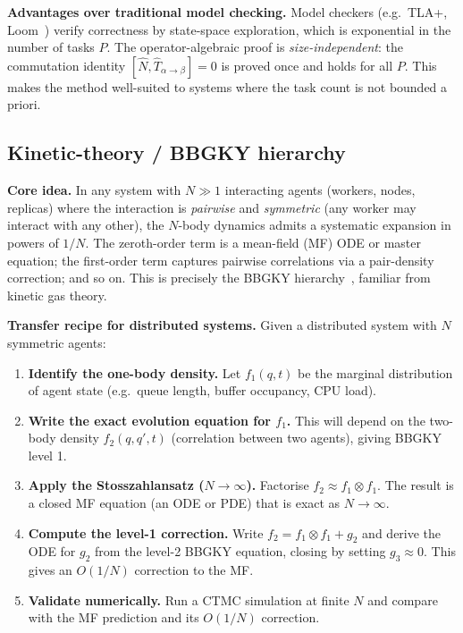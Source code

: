 \documentclass[11pt,a4paper]{article}
\begin{document}
\medskip
\noindent\textbf{Advantages over traditional model checking.}
Model checkers (e.g.\ TLA+, Loom~\cite{loom2023}) verify correctness by state-space
exploration, which is exponential in the number of tasks $P$.
The operator-algebraic proof is \emph{size-independent}: the commutation
identity $[\hat{N}, \hat{T}_{\alpha\to\beta}] = 0$ is proved once and holds
for all $P$.  This makes the method well-suited to systems where the task
count is not bounded a priori.

\subsection{Kinetic-theory / BBGKY hierarchy}

\medskip
\noindent\textbf{Core idea.}
In any system with $N \gg 1$ interacting agents (workers, nodes, replicas)
where the interaction is \emph{pairwise} and \emph{symmetric} (any worker
may interact with any other), the $N$-body dynamics admits a systematic
expansion in powers of $1/N$.  The zeroth-order term is a mean-field (MF)
ODE or master equation; the first-order term captures pairwise correlations
via a pair-density correction; and so on.  This is precisely the BBGKY
hierarchy~\cite{bogoliubov1946,born_green1949,kirkwood1946,yvon1935},
familiar from kinetic gas theory.

\medskip
\noindent\textbf{Transfer recipe for distributed systems.}
Given a distributed system with $N$ symmetric agents:
\begin{enumerate}
  \item \textbf{Identify the one-body density.}
        Let $f_1(q, t)$ be the marginal distribution of agent state
        (e.g.\ queue length, buffer occupancy, CPU load).
  \item \textbf{Write the exact evolution equation for $f_1$.}
        This will depend on the two-body density $f_2(q, q', t)$
        (correlation between two agents), giving BBGKY level 1.
  \item \textbf{Apply the Stosszahlansatz ($N \to \infty$).}
        Factorise $f_2 \approx f_1 \otimes f_1$.  The result is a
        closed MF equation (an ODE or PDE) that is exact as $N \to \infty$.
  \item \textbf{Compute the level-1 correction.}
        Write $f_2 = f_1 \otimes f_1 + g_2$ and derive the ODE for
        $g_2$ from the level-2 BBGKY equation, closing by setting
        $g_3 \approx 0$.  This gives an $O(1/N)$ correction to the MF.
  \item \textbf{Validate numerically.}
        Run a CTMC simulation at finite $N$ and compare with the
        MF prediction and its $O(1/N)$ correction.
\end{enumerate}
\end{document}
